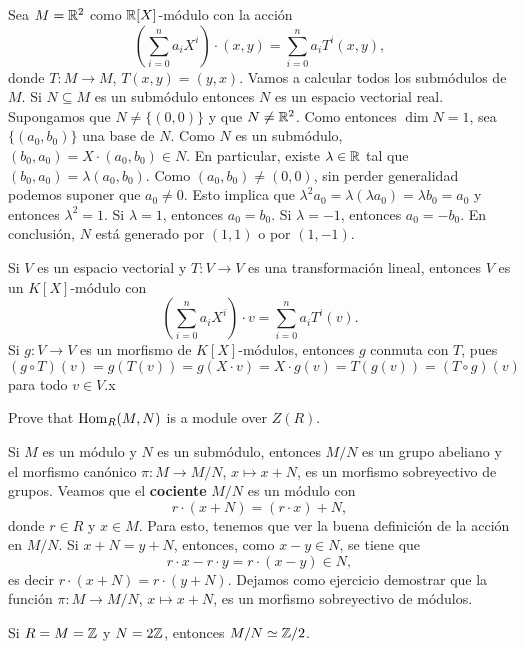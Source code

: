 \begin{example}
Sea $M=\mathbb{R}^2$ como $\mathbb{R}[X]$-módulo con la acción
\[
\left(\sum_{i=0}^n a_iX^i\right)\cdot (x,y)=\sum_{i=0}^n a_iT^i(x,y),
\]
donde $T\colon M\to M$, $T(x,y)=(y,x)$. 
Vamos a calcular todos los submódulos de $M$. 
Si $N\subseteq M$ es un submódulo entonces $N$ es un espacio vectorial real. Supongamos que $N\ne\{(0,0)\}$ y que $N\ne\mathbb{R}^2$. Como entonces $\dim N=1$, 
sea $\{(a_0,b_0)\}$ una base de $N$. Como $N$ es un submódulo,
$(b_0,a_0)=X\cdot (a_0,b_0)\in N$. En particular, existe $\lambda\in\mathbb{R}$ tal que $(b_0,a_0)=\lambda (a_0,b_0)$. Como $(a_0,b_0)\ne(0,0)$, sin perder generalidad
podemos suponer que $a_0\ne 0$. Esto implica que
$\lambda^2 a_0=\lambda (\lambda a_0)=\lambda b_0=a_0$ y entonces $\lambda^2=1$. Si $\lambda=1$, entonces
$a_0=b_0$. Si $\lambda=-1$, entonces $a_0=-b_0$. En conclusión, $N$ está generado por $(1,1)$ o por $(1,-1)$.  
\end{example}

\begin{example}
Si $V$ es un espacio vectorial y $T\colon V\to V$ es una transformación lineal, entonces
$V$ es un $K[X]$-módulo con 
\[
\left(\sum_{i=0}^n a_iX^i\right)\cdot v=\sum_{i=0}^n a_iT^i(v).
\]
Si $g\colon V\to V$ es un morfismo de $K[X]$-módulos, entonces $g$ conmuta con $T$, pues
\[
(g\circ T)(v)=g(T(v))=g(X\cdot v)=X\cdot g(v)=T(g(v))=(T\circ g)(v)
\]
para todo $v\in V$.x
\end{example}

\begin{exercise}
\label{exa:Hom}
Prove that $\operatorname{Hom}_R(M,N)$ is a module over $Z(R)$. 
\end{exercise}

Si $M$ es un módulo y $N$ es un submódulo, entonces $M/N$ es un grupo abeliano y el morfismo
canónico $\pi\colon M\to M/N$, $x\mapsto x+N$, es un morfismo sobreyectivo de grupos. Veamos que 
el \textbf{cociente} $M/N$ es un módulo con 
\[
r\cdot (x+N)=(r\cdot x)+N,
\]
donde $r\in R$ y $x\in M$. Para esto, tenemos que ver la buena definición de la acción en $M/N$. Si $x+N=y+N$, entonces, como
$x-y\in N$, se tiene que 
\[
r\cdot x-r\cdot y=r\cdot (x-y)\in N,
\]
es decir $r\cdot (x+N)=r\cdot (y+N)$. Dejamos como ejercicio demostrar que la función $\pi\colon M\to M/N$, $x\mapsto x+N$, es
un morfismo sobreyectivo de módulos. 

\begin{example}
Si $R=M=\mathbb{Z}$ y $N=2\mathbb{Z}$, entonces $M/N\simeq\mathbb{Z}/2$. 
\end{example}

